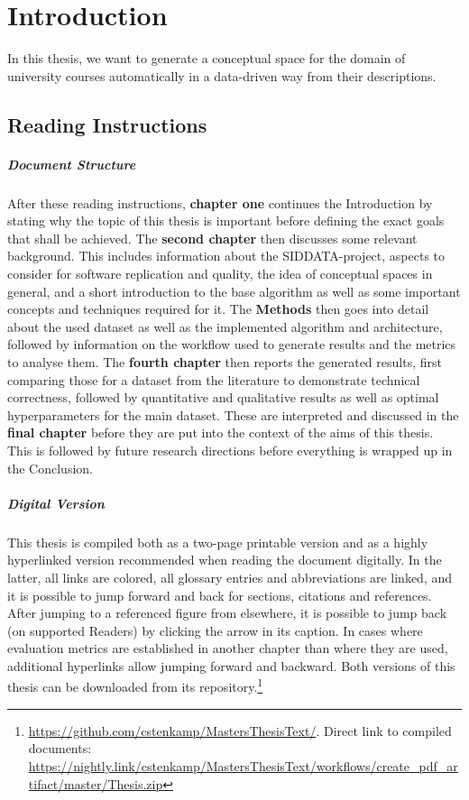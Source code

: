 \chapter{Introduction}

In this thesis, we want to generate a conceptual space for the domain of university courses automatically in a data-driven way from their descriptions. 

\section{Reading Instructions}

\paragraph*{Document Structure}

After these reading instructions, \textbf{chapter one} continues the Introduction by stating why the topic of this thesis is important before defining the exact goals that shall be achieved. The \textbf{second chapter} then discusses some relevant background. This includes information about the SIDDATA-project, aspects to consider for software replication and quality, the idea of conceptual spaces in general, and a short introduction to the base algorithm as well as some important concepts and techniques required for it. The \textbf{Methods} then goes into detail about the used dataset as well as the implemented algorithm and architecture, followed by information on the workflow used to generate results and the metrics to analyse them. The \textbf{fourth chapter} then reports the generated results, first comparing those for a dataset from the literature to demonstrate technical correctness, followed by quantitative and qualitative results as well as optimal hyperparameters for the main dataset. These are interpreted and discussed in the \textbf{final chapter} before they are put into the context of the aims of this thesis. This is followed by future research directions before everything is wrapped up in the Conclusion.

\paragraph*{Digital Version}

This thesis is compiled both as a two-page printable version and as a highly hyperlinked version recommended when reading the document digitally. In the latter, all links are colored, all glossary entries and abbreviations are linked, and it is possible to jump forward and back for sections, citations and references. After jumping to a referenced figure from elsewhere, it is possible to jump back (on supported Readers) by clicking the arrow in its caption. In cases where \eg evaluation metrics are established in another chapter than where they are used, additional hyperlinks allow jumping forward and backward. Both versions of this thesis can be downloaded from its repository.\footnote{\url{https://github.com/cstenkamp/MastersThesisText/}. Direct link to compiled documents: \url{https://nightly.link/cstenkamp/MastersThesisText/workflows/create_pdf_artifact/master/Thesis.zip}}

